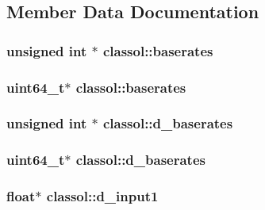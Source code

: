 \subsection{Member Data Documentation}
\hypertarget{classclassol_a7aa9c750f4ce5925003cb6b9cd215f8e}{
\subsubsection[{baserates}]{\setlength{\rightskip}{0pt plus 5cm}unsigned int $\ast$ classol\+::baserates}}\label{classclassol_a7aa9c750f4ce5925003cb6b9cd215f8e}
\hypertarget{classclassol_afc6650247da3c85e829264ccb5c4f569}{
\subsubsection[{baserates}]{\setlength{\rightskip}{0pt plus 5cm}uint64\+\_\+t$\ast$ classol\+::baserates}}\label{classclassol_afc6650247da3c85e829264ccb5c4f569}
\hypertarget{classclassol_a0453758295a0bcabf7ae00949a51e717}{
\subsubsection[{d\+\_\+baserates}]{\setlength{\rightskip}{0pt plus 5cm}unsigned int $\ast$ classol\+::d\+\_\+baserates}}\label{classclassol_a0453758295a0bcabf7ae00949a51e717}
\hypertarget{classclassol_adee39c3f46e3b1b691b047f7fae179c6}{
\subsubsection[{d\+\_\+baserates}]{\setlength{\rightskip}{0pt plus 5cm}uint64\+\_\+t$\ast$ classol\+::d\+\_\+baserates}}\label{classclassol_adee39c3f46e3b1b691b047f7fae179c6}
\hypertarget{classclassol_a29d842c266bb5c84cdc3ef1e7d7d4e06}{
\subsubsection[{d\+\_\+input1}]{\setlength{\rightskip}{0pt plus 5cm}float$\ast$ classol\+::d\+\_\+input1}}\label{classclassol_a29d842c266bb5c84cdc3ef1e7d7d4e06}
